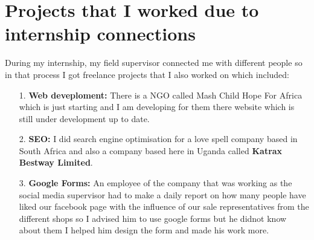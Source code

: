 \section{Projects that I worked due to internship connections}
During my internship, my field supervisor connected me with different people so in that process I got freelance projects that I also worked on which included:
\medskip
\begin{itemize}
\item[1.]\textbf{Web deveploment:} There is a NGO called Mash Child Hope For Africa which is just starting and I am developing for them there website which is still under development up to date.
\item[2.] \textbf{SEO:} I did search engine optimisation for a love spell company based in South Africa and also a company based here in Uganda called \textbf{Katrax Bestway Limited}.
\item[3.] \textbf{Google Forms:} An employee of the company that was working as the social media supervisor had to make a daily report on how many people have liked our facebook page with the influence of our sale representatives from the different shops so I advised him to use google forms but he didnot know about them I helped him design the form and made his work more.  
\end{itemize}